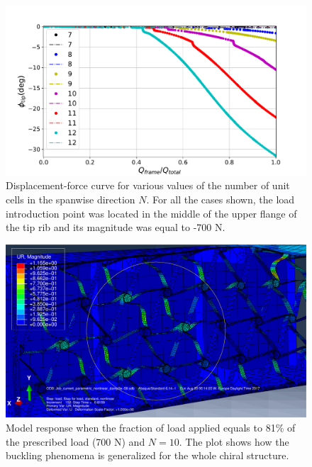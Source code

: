     \begin{figure}[!htpb] %
      \centering
      \includegraphics[width=0.8 \textwidth]{../figures/result-sim/N/force_displacement-far}
      \caption[Displacement-force curve for various values of the number of unit cells in the spanwise direction]{Displacement-force curve for various values of the number of unit cells in the spanwise direction $N$. For all the cases shown, the load introduction point was located in the middle of the upper flange of the tip rib and its magnitude was equal to -700 N.}\label{fig:forceDisplacement-far-N}
    \end{figure}

    \begin{figure}[!htpb] %
      \centering
      \includegraphics[width=0.8 \textwidth]{../figures/result-sim/N/10}
      \caption[Model response when the fraction of load applied equals to 81\% of the prescribed load (700 N) and $N = 10$]{Model response when the fraction of load applied equals to 81\% of the prescribed load (700 N) and $N = 10$. The plot shows how the buckling phenomena is generalized for the whole chiral structure.}\label{fig:N10-UR}
    \end{figure}

